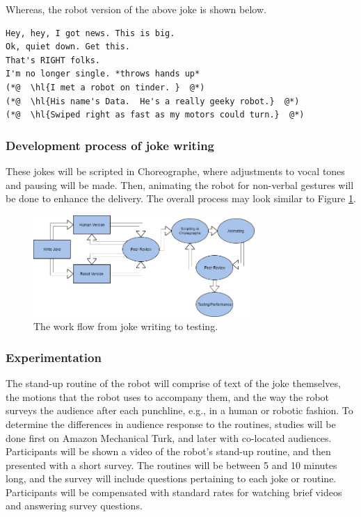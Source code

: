 \documentclass[onecolumn, draftclsnofoot,10pt, compsoc]{IEEEtran}
\begin{document}
Whereas, the robot version of the above joke is shown below.

\begin{lstlisting}
Hey, hey, I got news. This is big.
Ok, quiet down. Get this.
That's RIGHT folks.
I'm no longer single. *throws hands up*
(*@  \hl{I met a robot on tinder. }  @*)
(*@  \hl{His name's Data.  He's a really geeky robot.}  @*)
(*@  \hl{Swiped right as fast as my motors could turn.}  @*)
\end{lstlisting}

\subsubsection{Development process of joke writing}
These jokes will be scripted in Choreographe, where adjustments to vocal tones and pausing will be made.
Then, animating the robot for non-verbal gestures will be done to enhance the delivery.
The overall process may look similar to Figure \ref{fig:write_process}.

\begin{figure}[H]
  \centering
  \includegraphics[width=0.75\textwidth,height=0.75\textheight,keepaspectratio]{joke_writing_process}
  \caption{The work flow from joke writing to testing.}
	\label{fig:write_process}
\end{figure}

\subsubsection{Experimentation}
The stand-up routine of the robot will comprise of text of the joke themselves, the motions that the robot uses to
accompany them, and the way the robot surveys the audience after each punchline, e.g., in a human or robotic fashion.
To determine the differences in audience response to the routines, studies will be done first on Amazon Mechanical
Turk, and later with co-located audiences. Participants will be shown a video of the robot’s stand-up routine, and then
presented with a short survey. The routines will be between 5 and 10 minutes long, and the survey will include questions
pertaining to each joke or routine. Participants will be compensated with standard rates for watching brief videos and
answering survey questions.
\end{document}
